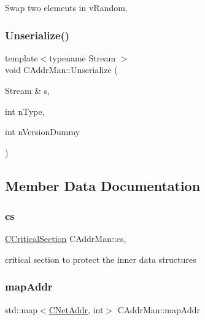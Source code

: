 Swap two elements in v\+Random. 

\mbox{\label{class_c_addr_man_a68eaf1797ecb8bff380aa7f9fc452e14}} 
\subsubsection{\texorpdfstring{Unserialize()}{Unserialize()}}
{\footnotesize\ttfamily template$<$typename Stream $>$ \\
void C\+Addr\+Man\+::\+Unserialize (\begin{DoxyParamCaption}\item[{Stream \&}]{s,  }\item[{int}]{n\+Type,  }\item[{int}]{n\+Version\+Dummy }\end{DoxyParamCaption})\hspace{0.3cm}{\ttfamily [inline]}}



\subsection{Member Data Documentation}
\mbox{\label{class_c_addr_man_aa4519d05a02e493046e5ece1ce87c084}} 
\subsubsection{\texorpdfstring{cs}{cs}}
{\footnotesize\ttfamily \mbox{\hyperlink{sync_8h_a37a4692b2d517f2843655ca11af7668a}{C\+Critical\+Section}} C\+Addr\+Man\+::cs\hspace{0.3cm}{\ttfamily [mutable]}, {\ttfamily [private]}}



critical section to protect the inner data structures 

\mbox{\label{class_c_addr_man_a5c387857d8553818a56a4faac33fb691}} 
\subsubsection{\texorpdfstring{map\+Addr}{mapAddr}}
{\footnotesize\ttfamily std\+::map$<$\mbox{\hyperlink{class_c_net_addr}{C\+Net\+Addr}}, int$>$ C\+Addr\+Man\+::map\+Addr\hspace{0.3cm}{\ttfamily [private]}}



